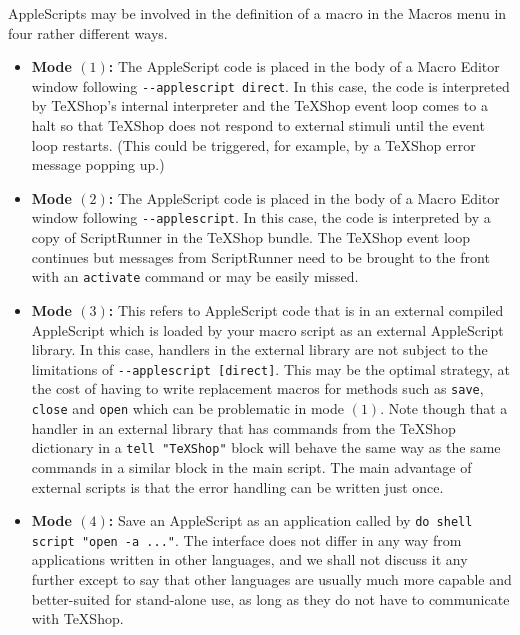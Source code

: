 \documentclass[11pt]{amsart}
\def\TeXShop{\TeX Shop\xspace}
\def\Macros{\textsf{Macros}\xspace}
\begin{document}
AppleScripts may be involved in the definition of a macro in the \Macros menu in four rather different ways.
\begin{itemize}
\item \textbf{Mode $(1)$:}
The AppleScript code is placed in the body of a Macro Editor window following  \verb|--applescript direct|. In this case, the code is interpreted by \TeXShop's internal interpreter and the \TeXShop event loop comes to a halt so that \TeXShop does not respond to external stimuli until the event loop restarts. (This could be triggered, for example, by a \TeXShop error message popping up.)
\item \textbf{Mode $(2)$:} The AppleScript code is placed in the body of a Macro Editor window following  \verb|--applescript|. In this case, the code is interpreted by a copy of ScriptRunner in the \TeXShop bundle. The \TeXShop event loop continues but messages from ScriptRunner need to be brought to the front with an {\tt activate} command or may be easily missed.
\item \textbf{Mode $(3)$:}
This refers to AppleScript code that is in an external compiled AppleScript which is loaded by your macro script as an external AppleScript library. In this case, handlers in the external library are not subject to the limitations of  {\tt-{}-applescript [direct]}. This may be the optimal strategy, at the cost of having to write replacement macros for methods such as  {\tt save}, {\tt close} and {\tt open} which can be problematic in mode $(1)$. Note though that a handler in an external library that has commands from the \TeXShop dictionary in a {\tt tell "TeXShop"} block will behave the same way as the same commands in a similar block in the main script. The main advantage of external scripts is that the error handling can be written just once.
\item \textbf{Mode $(4)$:} Save an AppleScript as an application called by \verb|do shell script "open -a ..."|.  The interface does not differ in any way from applications written in other languages, and we shall not discuss it any further except to say that other languages are usually much more capable and better-suited for stand-alone use, as long as they do not have to communicate with \TeXShop.
\end{itemize}

\end{document}
